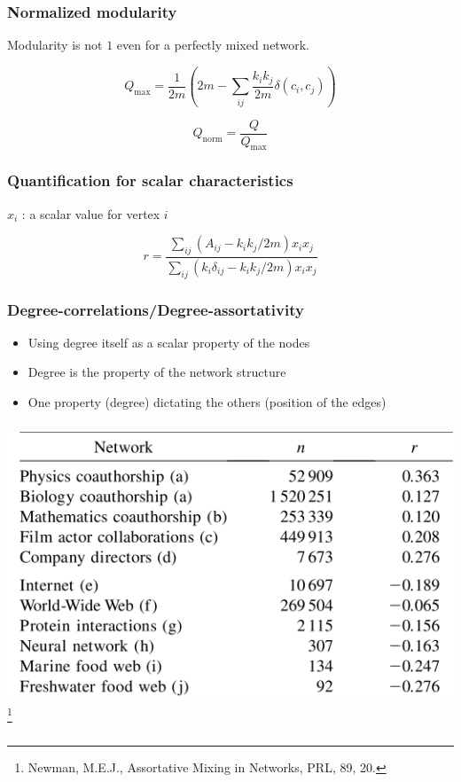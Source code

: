 \documentclass{beamer}
\begin{document}
\begin{frame}
    \frametitle{Normalized modularity}
    \centering
    Modularity is not $1$ even for a perfectly mixed network.

    \pause

    $$Q_{\text{max}} = \frac{1}{2m}\left(2m-\sum\limits_{ij}\frac{k_ik_j}{2m}\delta(c_i,c_j)\right)$$

    \pause
    $$Q_{\text{norm}} = \frac{Q}{Q_{\text{max}}}$$
\end{frame}
\begin{frame}
    \frametitle{Quantification for scalar characteristics}
    \centering
    $x_i$ : a scalar value for vertex $i$
    \vspace{1em}

    $$r = \frac{\sum\limits_{ij}(A_{ij}-k_ik_j/2m)x_ix_j}{\sum\limits_{ij}(k_i\delta_{ij}-k_ik_j/2m)x_ix_j}$$
\end{frame}
\begin{frame}
    \frametitle{Degree-correlations/Degree-assortativity}
    
    \begin{itemize}
    \setlength\itemsep{1em}
        \item{Using degree itself as a scalar property of the nodes}
        \item{Degree is the property of the network structure}
        \item{One property (degree) dictating the others (position of the edges)}
    \end{itemize}
\end{frame}
\begin{frame}
    \frametitle{}
    \centering
    \includegraphics[width=\columnwidth]{assortativity_list.png}
\footnote{Newman, M.E.J., Assortative Mixing in Networks, PRL, 89, 20.}
\end{frame}
\begin{frame}
    \frametitle{}
\end{frame}
\end{document}
